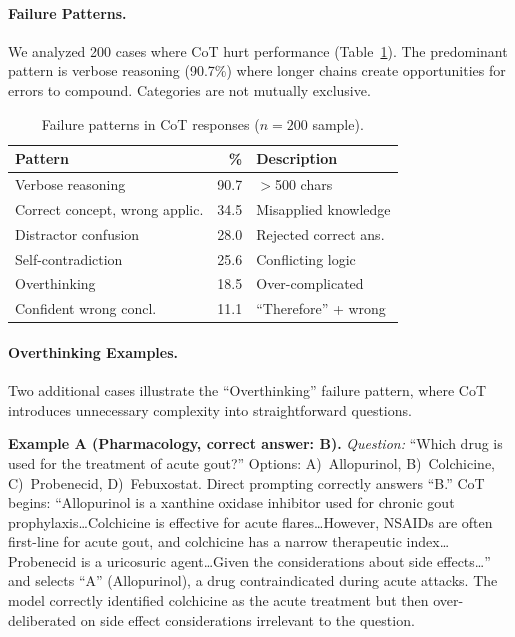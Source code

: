 \documentclass[runningheads,a4paper]{llncs}
\begin{document}
\paragraph{Failure Patterns.}
We analyzed 200 cases where CoT hurt performance (Table~\ref{tab:cot_failures}). The predominant pattern is verbose reasoning (90.7\%) where longer chains create opportunities for errors to compound. Categories are not mutually exclusive.

\begin{table}[t]
\centering
\caption{Failure patterns in CoT responses ($n{=}200$ sample).}
\label{tab:cot_failures}
\begin{tabular}{lrl}
\toprule
\textbf{Pattern} & \textbf{\%} & \textbf{Description} \\
\midrule
Verbose reasoning & 90.7 & $>$500 chars \\
Correct concept, wrong applic. & 34.5 & Misapplied knowledge \\
Distractor confusion & 28.0 & Rejected correct ans. \\
Self-contradiction & 25.6 & Conflicting logic \\
Overthinking & 18.5 & Over-complicated \\
Confident wrong concl. & 11.1 & ``Therefore'' + wrong \\
\bottomrule
\end{tabular}
\end{table}

\paragraph{Overthinking Examples.}
Two additional cases illustrate the ``Overthinking'' failure pattern, where CoT introduces unnecessary complexity into straightforward questions.

\smallskip\noindent\textbf{Example A (Pharmacology, correct answer: B).}
\textit{Question:} ``Which drug is used for the treatment of acute gout?''
Options: A)~Allopurinol, B)~Colchicine, C)~Probenecid, D)~Febuxostat.
Direct prompting correctly answers ``B.'' CoT begins: ``Allopurinol is a xanthine oxidase inhibitor used for chronic gout prophylaxis\ldots Colchicine is effective for acute flares\ldots However, NSAIDs are often first-line for acute gout, and colchicine has a narrow therapeutic index\ldots Probenecid is a uricosuric agent\ldots Given the considerations about side effects\ldots'' and selects ``A'' (Allopurinol), a drug contraindicated during acute attacks. The model correctly identified colchicine as the acute treatment but then over-deliberated on side effect considerations irrelevant to the question.
\end{document}
